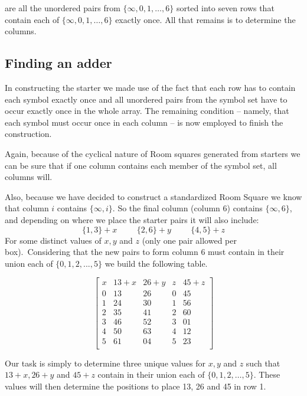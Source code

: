 \documentclass[
  11pt,
  a4paper]{book}\usepackage[]{graphicx}\usepackage[]{xcolor}
\begin{document}
are all the unordered pairs from $\{\infty, 0, 1, \ldots, 6\}$
sorted into seven rows that contain each of
$\{\infty, 0, 1, \ldots, 6\}$ exactly once. All that remains is to
determine the columns.

\subsection{Finding an adder}

In constructing the starter we made use of the fact that
each row has to contain each symbol exactly once and all
unordered pairs from the symbol set have to occur exactly
once in the whole array. The remaining condition – namely,
that each symbol must occur once in each column – is now
employed to finish the construction.

Again, because of the cyclical nature of Room squares
generated from starters we can be sure that if one column
contains each member of the symbol set, all columns will.

Also, because we have decided to construct a standardized
Room Square we know that column $i$ contains $\{\infty,i\}$.
So the final column (column 6) contains $\{\infty,6\}$, and
depending on where we place the starter pairs it will also
include: $$\{1,3\}+x \hspace{1cm} \{2,6\}+y \hspace{1cm}
\{4,5\}+z$$ For some distinct values of $x,y$ and $z$ (only
one pair allowed per box).\ Considering that the new pairs
to form column 6 must contain in their union each of
$\{0,1,2,...,5\}$ we build the following table.

\begin{equation}
  \begin{bmatrix}
    x &  13 + x & 26 + y & z & 45 + z \\
    0 &    13   &   26   & 0 &   45   \\
    1 &    24   &   30   & 1 &   56   \\
    2 &    35   &   41   & 2 &   60   \\
    3 &    46   &   52   & 3 &   01   \\
    4 &    50   &   63   & 4 &   12   \\
    5 &    61   &   04   & 5 &   23   \\
  \end{bmatrix}
  \label{eq:adder}
\end{equation}

Our task is simply to determine three unique values for $x,
y$ and $z$ such that $13 + x, 26 + y$ and $45 + z$ contain
in their union each of $\{0, 1, 2, \ldots, 5\}$. These
values will then determine the positions to place 13, 26 and
45 in row 1.
\end{document}
